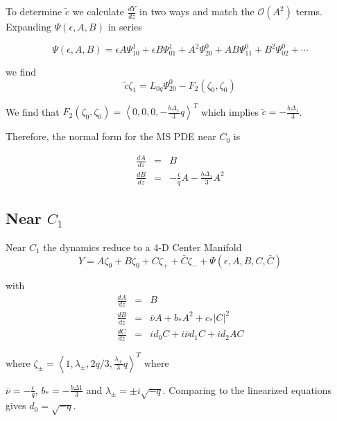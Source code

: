 To determine $\tilde{c}$ we calculate $\frac{dY}{dz}$ in two ways and match the $\mathcal{O}(A^2)$ terms. Expanding $\Psi(\epsilon,A,B)$ in series 

\begin{equation}
\Psi(\epsilon,A,B) = \epsilon A \Psi_{10}^1 + \epsilon B \Psi_{01}^1 + A^2 \Psi_{20}^0 + A B \Psi_{11}^0 + B^2 \Psi_{02}^0 + \cdots
\end{equation}

we find \begin{equation} \tilde{c} \zeta_1 = L_{0q} \Psi_{20}^0 - F_2(\zeta_0,\zeta_0) \end{equation}

We find that $F_2(\zeta_0,\zeta_0) = \left<0,0,0,-\frac{ b \Delta_1 }{3} q \right>^T$ which implies $\tilde{c} = - \frac{b \Delta_1}{3} $.

Therefore, the normal form for the MS PDE near $C_0$ is

\begin{subequations}
\begin{eqnarray}
\frac{dA}{dz} &=& B \\
\frac{dB}{dz} &=& -\frac{\epsilon}{q} A - \frac{ b \Delta_1}{3}  A^2
\end{eqnarray}
\end{subequations}


\subsection{ Near $C_1$ }
Near $C_1$ the dynamics reduce to a 4-D Center Manifold
\begin{equation} Y = A \zeta_0 + B \zeta_0 + C \zeta_+ + \bar{C} \zeta_- + \Psi(\epsilon,A,B,C,\bar{C})
\end{equation}

with 
\begin{subequations}
\begin{eqnarray}
\frac{dA}{dz} &=& B \\ \label{eq:aq}
\frac{dB}{dz} &=& \bar{\nu} A + b_* A^2 + c_* \left|C\right|^2 \\ \label{eq:bq}
\frac{dC}{dz} &=& i d_0 C + i \bar{\nu} d_1 C + i d_2 A C \label{eq:cq}
\end{eqnarray}
\end{subequations}

where  $\zeta_\pm = \left< 1, \lambda_\pm, 2 q / 3, \frac{\lambda_\pm}{3} q\right>^T$ where 

$\bar{\nu} = -\frac{\epsilon}{q}$, $b_* = -\frac{b \Delta1}{3}$  and $\lambda_\pm = \pm i \sqrt{-q} $. Comparing to the linearized equations gives $d_0 = \sqrt{-q} $.

